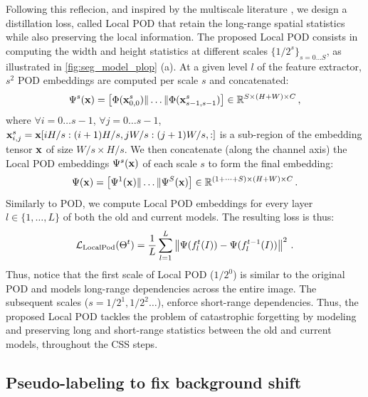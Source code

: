 Following this reflecion, and inspired by the multiscale literature
\cite{lazbnik2006spatial_pyramid_matching,he2014spatialpyramidpooling}, we design a distillation
loss, called Local POD that retain the long-range spatial statistics while also preserving the local
information. The proposed Local POD consists in computing the width and height statistics at
different scales $\{1/2^s\}_{s=0 \dots S}$, as illustrated in \autoref{fig:seg_model_plop} (a). At a
given level $l$ of the feature extractor, $s^2$ POD embeddings are computed per scale $s$ and
concatenated:
%
\begin{equation}
    \Psi^s(\mathbf{x}) = \left[ \Phi(\mathbf{x}^s_{0,0}) \| \dots \| \Phi(\mathbf{x}^s_{s-1,s-1}) \right] \in \mathbb{R}^{S \times (H + W) \times C}\,,
    \label{eq:seg_localpod_embedding1}
\end{equation}
%
where $\forall i = 0 \dots s-1$, $\forall j = 0 \dots s-1$, $\mathbf{x}^s_{i,j} = \mathbf{x}[i H/s:(i+1) H/s, j
        W/s:(j+1) W/s,:]$ is a sub-region of the embedding tensor $\mathbf{x}$ of size $W/s \times H/s$. We
then concatenate (along the channel axis) the Local POD embeddings $\Psi^s(\mathbf{x})$ of each
scale $s$ to form the final embedding:
%
\begin{equation}
    \Psi(\mathbf{x}) = \left[ \Psi^1(\mathbf{x}) \| \dots \| \Psi^S(\mathbf{x}) \right] \in \mathbb{R}^{(1 + \dots + S) \times (H + W) \times C}\,.
    \label{eq:seg_local_pod}
\end{equation}
%
Similarly to POD, we compute Local POD embeddings for every layer $l \in \{1, \dots, L\}$ of both
the old and current models. The resulting loss is thus:
%
\begin{equation}
    \mathcal{L}_{\scriptstyle\text{LocalPod}}(\Theta^t) = \frac{1}{L} \sum_{l = 1}^L \left\Vert  {\Psi}(f^t_l(I)) -  {\Psi}(f^{t-1}_l(I)) \right\Vert^2\,.
    \label{eq:seg_local_pod_loss}
\end{equation}
%
Thus, notice that the first scale of Local POD ($1/2^0$) is similar to the original POD and models
long-range dependencies across the entire image. The subsequent scales ($s=1/2^1, 1/2^2 \dots$),
enforce short-range dependencies. Thus, the proposed Local POD tackles the problem of catastrophic
forgetting by modeling and preserving long and short-range statistics between the old and current
models, throughout the \ac{CSS} steps.


\subsection{Pseudo-labeling to fix background shift}\label{sec:seg_hardpl}

